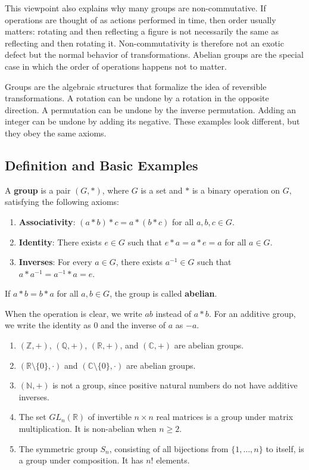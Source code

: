 This viewpoint also explains why many groups are non-commutative. If operations are thought of as actions performed in time, then order usually matters: rotating and then reflecting a figure is not necessarily the same as reflecting and then rotating it. Non-commutativity is therefore not an exotic defect but the normal behavior of transformations. Abelian groups are the special case in which the order of operations happens not to matter.

Groups are the algebraic structures that formalize the idea of reversible transformations. A rotation can be undone by a rotation in the opposite direction. A permutation can be undone by the inverse permutation. Adding an integer can be undone by adding its negative. These examples look different, but they obey the same axioms.

\subsection{Definition and Basic Examples}

\begin{definition}[Group]
A \textbf{group} is a pair $(G,*)$, where $G$ is a set and $*$ is a binary operation on $G$, satisfying the following axioms:
\begin{enumerate}
    \item \textbf{Associativity}: $(a*b)*c=a*(b*c)$ for all $a,b,c\in G$.
    \item \textbf{Identity}: There exists $e\in G$ such that $e*a=a*e=a$ for all $a\in G$.
    \item \textbf{Inverses}: For every $a\in G$, there exists $a^{-1}\in G$ such that $a*a^{-1}=a^{-1}*a=e$.
\end{enumerate}
If $a*b=b*a$ for all $a,b\in G$, the group is called \textbf{abelian}.
\end{definition}

When the operation is clear, we write $ab$ instead of $a*b$. For an additive group, we write the identity as $0$ and the inverse of $a$ as $-a$.

\begin{example}
\begin{enumerate}
    \item $(\mathbb{Z},+)$, $(\mathbb{Q},+)$, $(\mathbb{R},+)$, and $(\mathbb{C},+)$ are abelian groups.
    \item $(\mathbb{R}\setminus\{0\},\cdot)$ and $(\mathbb{C}\setminus\{0\},\cdot)$ are abelian groups.
    \item $(\mathbb{N},+)$ is not a group, since positive natural numbers do not have additive inverses.
    \item The set $GL_n(\mathbb{R})$ of invertible $n\times n$ real matrices is a group under matrix multiplication. It is non-abelian when $n\geq 2$.
    \item The symmetric group $S_n$, consisting of all bijections from $\{1,\dots,n\}$ to itself, is a group under composition. It has $n!$ elements.
\end{enumerate}
\end{example}

